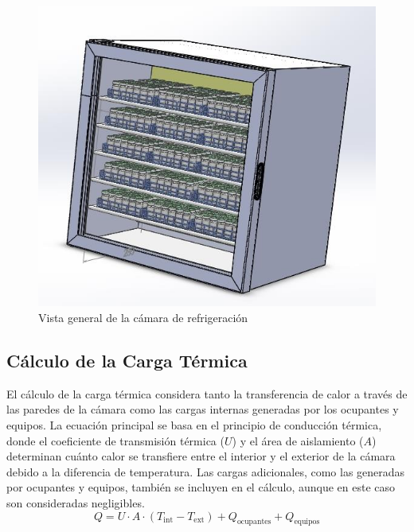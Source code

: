 \documentclass[11pt,a4paper]{article}
\begin{document}
\begin{multicols}{2}
	
	\begin{figure}[H]
		\centering
		\includegraphics[width=\linewidth]{figures/axo-parrilasycharolas}
		\caption{Vista general de la cámara de refrigeración}
		\label{fig:vista-camara}
	\end{figure}
	
	
	
	\subsection{Cálculo de la Carga Térmica}
	El cálculo de la carga térmica considera tanto la transferencia de calor a través de las paredes de la cámara como las cargas internas generadas por los ocupantes y equipos. La ecuación principal se basa en el principio de conducción térmica, donde el coeficiente de transmisión térmica ($U$) y el área de aislamiento ($A$) determinan cuánto calor se transfiere entre el interior y el exterior de la cámara debido a la diferencia de temperatura. Las cargas adicionales, como las generadas por ocupantes y equipos, también se incluyen en el cálculo, aunque en este caso son consideradas negligibles.
	\color{blue}
\begin{equation}
	Q = U \cdot A \cdot (T_{\text{int}} - T_{\text{ext}}) + Q_{\text{ocupantes}} + Q_{\text{equipos}} 
\end{equation}
\color{black}
	

\end{multicols}
\end{document}
